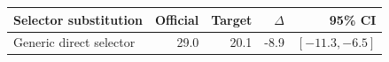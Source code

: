 \begin{tabular}{lrrrr}
\toprule
Selector substitution & Official & Target & $\Delta$ & 95\% CI \\
\midrule
Generic direct selector & 29.0 & 20.1 & -8.9 & $[-11.3,-6.5]$ \\
\bottomrule
\end{tabular}
